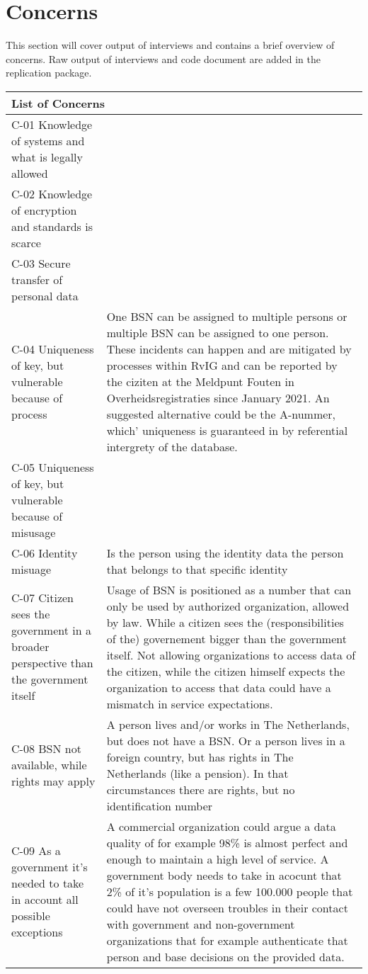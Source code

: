 \clearpage
\section*{Concerns}
This section will cover output of interviews and contains a brief overview of concerns. Raw output of interviews and code document are added in the replication package.

\begin{table}
\begin{tabular}{ |p{5cm}||p{11cm}|}
 \hline
 \multicolumn{2}{|l|}{List of Concerns} \\
 \hline
 C-01 Knowledge of systems and what is legally allowed    &        \\
 \hline
 C-02 Knowledge of encryption and standards is scarce &   \\
  \hline
 C-03 Secure transfer of personal data  &   \\
  \hline
C-04 Uniqueness of key, but vulnerable because of process
& One BSN can be assigned to multiple persons or multiple BSN can be assigned to one person. These incidents can happen and are mitigated by processes within RvIG and can be reported by the ciziten at the Meldpunt Fouten in Overheidsregistraties since January 2021. An suggested alternative could be the A-nummer, which' uniqueness is guaranteed in by referential intergrety of the database.
  \\
\hline
C-05 Uniqueness of key, but vulnerable because of misusage & \\
\hline
C-06 Identity misuage & Is the person using the identity data the person that belongs to that specific identity\\
\hline
C-07 Citizen sees the government in a broader perspective than the government itself & Usage of BSN is positioned as a number that can only be used by authorized organization, allowed by law. While a citizen sees the (responsibilities of the) governement bigger than the government itself. Not allowing organizations to access data of the citizen, while the citizen himself expects the organization to access that data could have a mismatch in service expectations.\\
\hline
C-08 BSN not available, while rights may apply & A person lives and/or works in The Netherlands, but does not have a BSN. Or a person lives in a foreign country, but has rights in The Netherlands (like a pension). In that circumstances there are rights, but no identification number\\
\hline
C-09 As a government it’s needed to take in account all possible exceptions & A commercial organization could argue a data quality of for example 98\% is almost perfect and enough to maintain a high level of service. A government body needs to take in acocunt that 2\% of it's population is a few 100.000 people that could have not overseen troubles in their contact with government and non-government organizations that for example authenticate that person and base decisions on the provided data. \\

\end{tabular}
\end{table}
